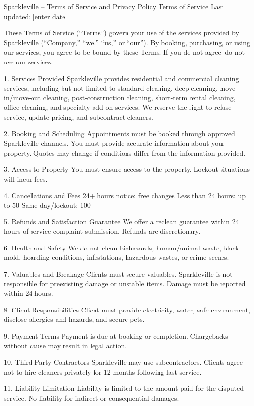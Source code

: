 Sparkleville – Terms of Service and Privacy Policy
Terms of Service
Last updated: [enter date]

These Terms of Service (“Terms”) govern your use of the services provided by Sparkleville (“Company,” “we,” “us,” or “our”). By booking, purchasing, or using our services, you agree to be bound by these Terms.
If you do not agree, do not use our services.

1. Services Provided
Sparkleville provides residential and commercial cleaning services, including but not limited to standard cleaning, deep cleaning, move-in/move-out cleaning, post-construction cleaning, short-term rental cleaning, office cleaning, and specialty add-on services.
We reserve the right to refuse service, update pricing, and subcontract cleaners.

2. Booking and Scheduling
Appointments must be booked through approved Sparkleville channels. You must provide accurate information about your property. Quotes may change if conditions differ from the information provided.

3. Access to Property
You must ensure access to the property. Lockout situations will incur fees.

4. Cancellations and Fees
24+ hours notice: free changes
Less than 24 hours: up to 50%
Same day/lockout: 100%

5. Refunds and Satisfaction Guarantee
We offer a reclean guarantee within 24 hours of service complaint submission. Refunds are discretionary.

6. Health and Safety
We do not clean biohazards, human/animal waste, black mold, hoarding conditions, infestations, hazardous wastes, or crime scenes.

7. Valuables and Breakage
Clients must secure valuables. Sparkleville is not responsible for preexisting damage or unstable items. Damage must be reported within 24 hours.

8. Client Responsibilities
Client must provide electricity, water, safe environment, disclose allergies and hazards, and secure pets.

9. Payment Terms
Payment is due at booking or completion. Chargebacks without cause may result in legal action.

10. Third Party Contractors
Sparkleville may use subcontractors. Clients agree not to hire cleaners privately for 12 months following last service.

11. Liability Limitation
Liability is limited to the amount paid for the disputed service. No liability for indirect or consequential damages.


